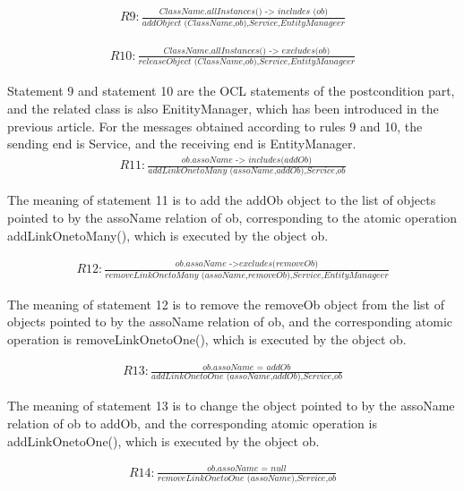 \documentclass[pdflatex,sn-mathphys-num]{sn-jnl}%
\theoremstyle{thmstyleone}%
\theoremstyle{thmstyletwo}%
\theoremstyle{thmstylethree}%
\begin{document}
\[
\begin{array}{l}
    \textit{R9}: \frac{\textit{ClassName.allInstances() -> includes (ob)}}{\textit{addObject (ClassName,ob),Service,EntityManageer}}
\end{array}
\]

\[
\begin{array}{l}
    \textit{R10}: \frac{\textit{ClassName.allInstances() -> excludes(ob)}}{\textit{releaseObject (ClassName,ob),Service,EntityManageer}}
\end{array}
\]

Statement 9 and statement 10 are the OCL statements of the postcondition part, and the related class is also EnitityManager, which has been introduced in the previous article. For the messages obtained according to rules 9 and 10, the sending end is Service, and the receiving end is EntityManager.
\[
\begin{array}{l}
    \textit{R11}: \frac{\textit{ob.assoName -> includes(addOb)}}{\textit{addLinkOnetoMany (assoName,addOb),Service,ob}}
\end{array}
\]

The meaning of statement 11 is to add the addOb object to the list of objects pointed to by the assoName relation of ob, corresponding to the atomic operation addLinkOnetoMany(), which is executed by the object ob.

\[
\begin{array}{l}
    \textit{R12}: \frac{\textit{ob.assoName ->excludes(removeOb)}}{\textit{removeLinkOnetoMany (assoName,removeOb),Service,EntityManageer}}
\end{array}
\]

The meaning of statement 12 is to remove the removeOb object from the list of objects pointed to by the assoName relation of ob, and the corresponding atomic operation is removeLinkOnetoOne(), which is executed by the object ob.

\[
\begin{array}{l}
    \textit{R13}: \frac{\textit{ob.assoName = addOb}}{\textit{addLinkOnetoOne (assoName,addOb),Service,ob}}
\end{array}
\]

The meaning of statement 13 is to change the object pointed to by the assoName relation of ob to addOb, and the corresponding atomic operation is addLinkOnetoOne(), which is executed by the object ob.

\[
\begin{array}{l}
    \textit{R14}: \frac{\textit{ob.assoName = null}}{\textit{removeLinkOnetoOne (assoName),Service,ob}}
\end{array}
\]
\end{document}
